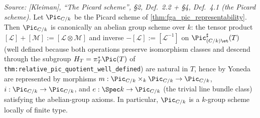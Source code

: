 \begin{theorem}
  \label{thm:pic_is_group_scheme}

  \textit{Source: [Kleiman], ``The Picard scheme'', \S 2, Def.~2.2 +
  \S 4, Def.~4.1 (the Picard scheme).}
  Let \(\Pic_{C/k}\) be the Picard scheme of
  \cref{thm:fga_pic_representability}. Then \(\Pic_{C/k}\) is canonically an
  abelian group scheme over \(k\): the tensor product
  \([\mathcal{L}] + [\mathcal{M}] := [\mathcal{L} \otimes \mathcal{M}]\)
  and inverse \(-[\mathcal{L}] := [\mathcal{L}^{-1}]\) on
  \(\Pic^\sharp_{(C/k)\et}(T)\) (well defined because both operations
  preserve isomorphism classes and descend through the subgroup
  \(H_T = \pi_T^*\Pic(T)\) of \texttt{thm:relative\_pic\_quotient\_well\_defined})
  are natural in \(T\), hence by Yoneda are represented by morphisms
  \(m : \Pic_{C/k} \times_k \Pic_{C/k} \to \Pic_{C/k}\),
  \(i : \Pic_{C/k} \to \Pic_{C/k}\), and
  \(e : \Spec k \to \Pic_{C/k}\) (the trivial line bundle class) satisfying
  the abelian-group axioms. In particular, \(\Pic_{C/k}\) is a \(k\)-group
  scheme locally of finite type.
\end{theorem}

